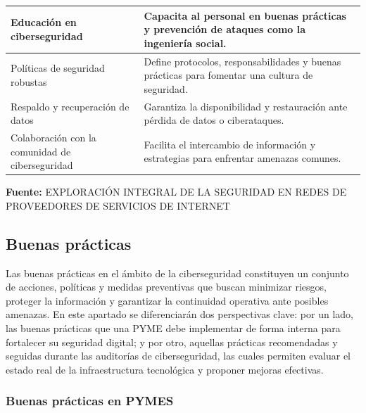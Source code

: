 \documentclass[a4paper, 11pt]{article}
\begin{document}
\begin{table}[H]
\begin{tabular}{p{4.5cm} p{10cm}}
    Educación en ciberseguridad & Capacita al personal en buenas prácticas y prevención de ataques como la ingeniería social. \\
    \bottomrule
    Políticas de seguridad robustas & Define protocolos, responsabilidades y buenas prácticas para fomentar una cultura de seguridad. \\
    \bottomrule
    Respaldo y recuperación de datos & Garantiza la disponibilidad y restauración ante pérdida de datos o ciberataques. \\
    \bottomrule
    Colaboración con la comunidad de ciberseguridad & Facilita el intercambio de información y estrategias para enfrentar amenazas comunes. \\
    \bottomrule
    \end{tabular}
    \vspace{0.5em}
    \begin{flushleft}
    \footnotesize \textbf{Fuente:} EXPLORACIÓN INTEGRAL DE LA SEGURIDAD EN REDES DE PROVEEDORES DE SERVICIOS DE INTERNET \cite{mitigacion}
    \end{flushleft}
    \label{tab:medidas_mitigacion}
\end{table}
\par\vspace{0.5cm}

\subsection{Buenas prácticas}
\par\vspace{0.5cm}
Las buenas prácticas en el ámbito de la ciberseguridad constituyen un conjunto de acciones, políticas y medidas preventivas que buscan minimizar riesgos, proteger la información y garantizar la continuidad operativa ante posibles amenazas. En este apartado se diferenciarán dos perspectivas clave: por un lado, las buenas prácticas que una PYME debe implementar de forma interna para fortalecer su seguridad digital; y por otro, aquellas prácticas recomendadas y seguidas durante las auditorías de ciberseguridad, las cuales permiten evaluar el estado real de la infraestructura tecnológica y proponer mejoras efectivas.
\par\vspace{0.5cm}

\subsubsection{Buenas prácticas en PYMES}
\par\vspace{0.5cm}
\end{document}
